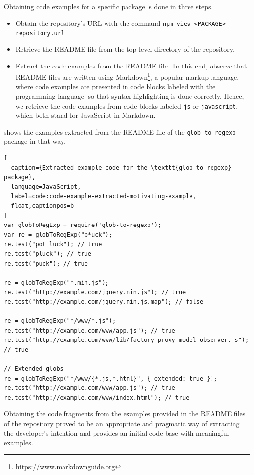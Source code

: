 \documentclass[sigconf]{acmart}
\begin{document}
Obtaining code examples for a specific \NPM{} package is done in three steps.
\begin{itemize}
\item Obtain the  repository's URL with the command
  \texttt{npm view <PACKAGE> repository.url}

\item Retrieve the README file from the top-level directory of the repository.

\item Extract the code examples from the README file. To this end,
  observe that README files are
  written using Markdown\footnote{\url{https://www.markdownguide.org}}, a
  popular markup language, where
  code examples are presented in code blocks labeled with the programming
  language, so that syntax highlighting is done correctly. Hence, we
  retrieve the code examples from code blocks labeled \texttt{js} or
  \texttt{javascript}, which both stand for JavaScript in
  Markdown.
\end{itemize}

 shows
the examples extracted from  the README file of the \texttt{glob-to-regexp} package in
that way.

\begin{lstlisting}[
  caption={Extracted example code for the \texttt{glob-to-regexp} package},
  language=JavaScript,
  label=code:code-example-extracted-motivating-example,
  float,captionpos=b
]
var globToRegExp = require('glob-to-regexp');
var re = globToRegExp("p*uck");
re.test("pot luck"); // true
re.test("pluck"); // true
re.test("puck"); // true

re = globToRegExp("*.min.js");
re.test("http://example.com/jquery.min.js"); // true
re.test("http://example.com/jquery.min.js.map"); // false

re = globToRegExp("*/www/*.js");
re.test("http://example.com/www/app.js"); // true
re.test("http://example.com/www/lib/factory-proxy-model-observer.js"); // true

// Extended globs
re = globToRegExp("*/www/{*.js,*.html}", { extended: true });
re.test("http://example.com/www/app.js"); // true
re.test("http://example.com/www/index.html"); // true
\end{lstlisting}

Obtaining the code fragments from the examples provided in the
README files of the repository proved to be an
appropriate and pragmatic way of extracting the developer's
intention and provides an initial code base with meaningful
examples.
\end{document}
